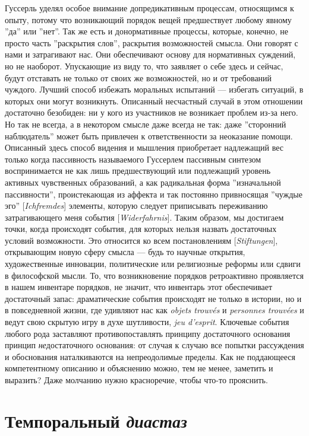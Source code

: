 \documentclass[12pt]{book}
\begin{document}
Гуссерль уделял особое внимание допредикативным процессам, относящимся к опыту, потому что возникающий порядок вещей предшествует любому явному ''да'' или ''нет''. Так же есть и донормативные процессы, которые, конечно, не просто часть ''раскрытия слов'', раскрытия возможностей смысла. Они говорят с нами и затрагивают нас. Они обеспечивают основу для нормативных суждений, но не наоборот. Упускающие из виду то, что заявляет о себе здесь и сейчас, будут отставать не только от своих же возможностей, но и от требований чуждого. Лучший способ избежать моральных испытаний --- избегать ситуаций, в которых они могут возникнуть. Описанный несчастный случай в этом отношении достаточно безобиден: ни у кого из участников не возникает проблем из-за него. Но так не всегда, а в некотором смысле даже всегда не так: даже ''сторонний наблюдатель'' может быть привлечен к ответственности за неоказание помощи. Описанный здесь способ видения и мышления приобретает надлежащий вес только когда пассивность называемого Гуссерлем пассивным синтезом воспринимается не как лишь предшествующий или подлежащий уровень активных чувственных образований, а как радикальная форма ''изначальной пассивности'', проистекающая из аффекта и так постоянно привносящая ''чуждые эго'' [\textit{Ichfremdes}] элементы, которую следует приписывать переживанию затрагивающего меня события [\textit{Widerfahrnis}]. Таким образом, мы достигаем точки, когда происходят события, для которых нельзя назвать достаточных условий возможности. Это относится ко всем постановлениям [\textit{Stiftungen}], открывающим новую сферу смысла --- будь то научные открытия, художественные инновации, политические или религиозные реформы или сдвиги в философской мысли. То, что возникновение порядков ретроактивно проявляется в нашем инвентаре порядков, не значит, что инвентарь этот обеспечивает достаточный запас: драматические события происходят не только в истории, но и в повседневной жизни, где удивляют нас как \textit{objets trouvés} и \textit{personnes trouvées} и ведут свою скрытую игру в духе шутливости, \textit{jeu d’esprit}. Ключевые события любого рода заставляют противопоставлять принципу достаточного основания принцип \textit{не}достаточного основания: от случая к случаю все попытки рассуждения и обоснования наталкиваются на непреодолимые пределы. Как не поддающееся компетентному описанию и объяснению можно, тем не менее, заметить и выразить? Даже молчанию нужно красноречие, чтобы что-то прояснить.

\section{Темпоральный \textit{диастаз}}
\end{document}
